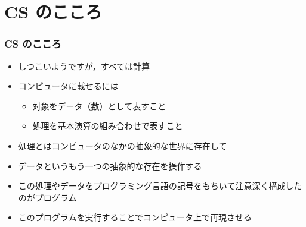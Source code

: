 \section{CS のこころ}
%
%
\begin{frame}
\frametitle{CS のこころ}
  \begin{itemize}
\item しつこいようですが，すべては計算
\item コンピュータに載せるには
    \begin{itemize}
\item 対象をデータ（数）として表すこと
\item 処理を基本演算の組み合わせで表すこと
    \end{itemize}
\item 処理とはコンピュータのなかの抽象的な世界に存在して
\item データというもう一つの抽象的な存在を操作する
\item この処理やデータをプログラミング言語の記号をもちいて注意深く構成したのがプログラム
\item このプログラムを実行することでコンピュータ上で再現させる
  \end{itemize}
\end{frame}
%
%
